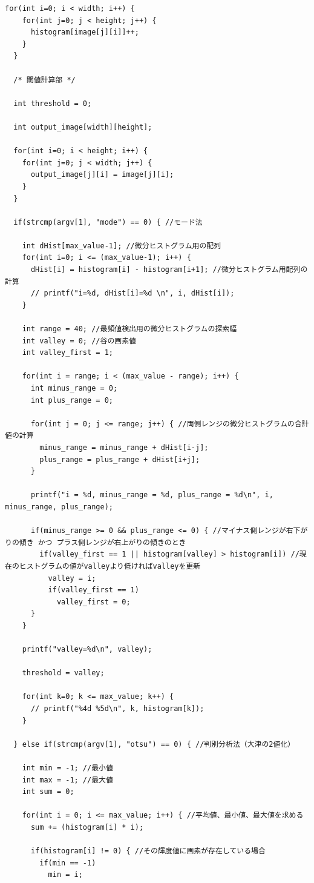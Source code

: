 \documentclass{jsarticle}
\begin{document}
\begin{lstlisting}[caption=binarization.c,label=ほげ]
  for(int i=0; i < width; i++) {
    for(int j=0; j < height; j++) {
      histogram[image[j][i]]++;
    }
  }

  /* 閾値計算部 */

  int threshold = 0;

  int output_image[width][height];

  for(int i=0; i < height; i++) {
    for(int j=0; j < width; j++) {
      output_image[j][i] = image[j][i];
    }
  }

  if(strcmp(argv[1], "mode") == 0) { //モード法

    int dHist[max_value-1]; //微分ヒストグラム用の配列
    for(int i=0; i <= (max_value-1); i++) {
      dHist[i] = histogram[i] - histogram[i+1]; //微分ヒストグラム用配列の計算
      // printf("i=%d, dHist[i]=%d \n", i, dHist[i]);
    }

    int range = 40; //最頻値検出用の微分ヒストグラムの探索幅
    int valley = 0; //谷の画素値
    int valley_first = 1;

    for(int i = range; i < (max_value - range); i++) {
      int minus_range = 0;
      int plus_range = 0;

      for(int j = 0; j <= range; j++) { //両側レンジの微分ヒストグラムの合計値の計算
        minus_range = minus_range + dHist[i-j];
        plus_range = plus_range + dHist[i+j];
      }

      printf("i = %d, minus_range = %d, plus_range = %d\n", i, minus_range, plus_range);

      if(minus_range >= 0 && plus_range <= 0) { //マイナス側レンジが右下がりの傾き かつ プラス側レンジが右上がりの傾きのとき
        if(valley_first == 1 || histogram[valley] > histogram[i]) //現在のヒストグラムの値がvalleyより低ければvalleyを更新
          valley = i;
          if(valley_first == 1)
            valley_first = 0;
      }
    }

    printf("valley=%d\n", valley);

    threshold = valley;

    for(int k=0; k <= max_value; k++) {
      // printf("%4d %5d\n", k, histogram[k]);
    }

  } else if(strcmp(argv[1], "otsu") == 0) { //判別分析法（大津の2値化）

    int min = -1; //最小値
    int max = -1; //最大値
    int sum = 0;

    for(int i = 0; i <= max_value; i++) { //平均値、最小値、最大値を求める
      sum += (histogram[i] * i);

      if(histogram[i] != 0) { //その輝度値に画素が存在している場合
        if(min == -1)
          min = i;


\end{lstlisting}
\end{document}
